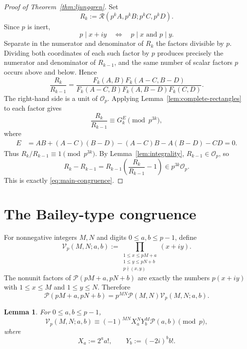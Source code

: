 \documentclass[a4paper,american,11pt]{amsart}
\numberwithin{equation}{section}
\newtheorem{lemma}[theorem]{Lemma}
\theoremstyle{definition}
\newcommand{\Op}{\mathcal O_p}
\newcommand{\Rect}{\mathcal R}
\newcommand{\Prect}{\mathcal P}
\begin{document}
\begin{proof}[Proof of Theorem~\ref{thm:ljunggren}]
Set
\[
R_k:=\Rect(p^kA,p^kB;p^kC,p^kD).
\]
Since $p$ is inert,
\[
p\mid x+iy
\quad\Longleftrightarrow\quad
p\mid x\text{ and }p\mid y.
\]
Separate in the numerator and denominator of $R_k$ the factors divisible by $p$. Dividing both coordinates of each such factor by $p$ produces precisely the numerator and denominator of $R_{k-1}$, and the same number of scalar factors $p$ occurs above and below. Hence
\begin{equation}\label{eq:R-ratio-units}
\frac{R_k}{R_{k-1}}
=
\frac{F_k(A,B)F_k(A-C,B-D)}
{F_k(A-C,B)F_k(A,B-D)F_k(C,D)}.
\end{equation}
The right-hand side is a unit of $\Op$. Applying Lemma~\ref{lem:complete-rectangles} to each factor gives
\[
\frac{R_k}{R_{k-1}}
\equiv
G_k^E
\pmod{p^{3k}},
\]
where
\begin{align*}
E
&=AB+(A-C)(B-D)-(A-C)B-A(B-D)-CD
=0.
\end{align*}
Thus $R_k/R_{k-1}\equiv1\pmod{p^{3k}}$. By Lemma~\ref{lem:integrality}, $R_{k-1}\in\Op$, so
\[
R_k-R_{k-1}
=R_{k-1}\left(\frac{R_k}{R_{k-1}}-1\right)
\in p^{3k}\Op.
\]
This is exactly \eqref{eq:main-congruence}.
\end{proof}

\section{The Bailey-type congruence}\label{sec:bailey-proof}

For nonnegative integers $M,N$ and digits $0\leq a,b\leq p-1$, define
\begin{equation}\label{eq:def-unit-product}
\mathcal V_p(M,N;a,b)
:=
\prod_{\substack{1\leq x\leq pM+a\\1\leq y\leq pN+b\\p\nmid(x,y)}}(x+iy).
\end{equation}
The nonunit factors of $\Prect(pM+a,pN+b)$ are exactly the numbers $p(x+iy)$ with $1\leq x\leq M$ and $1\leq y\leq N$. Therefore
\begin{equation}\label{eq:P-splitting}
\Prect(pM+a,pN+b)
=p^{MN}\Prect(M,N)\mathcal V_p(M,N;a,b).
\end{equation}

\begin{lemma}\label{lem:unit-product-mod-p}
For $0\leq a,b\leq p-1$,
\begin{equation}\label{eq:unit-product-mod-p}
\mathcal V_p(M,N;a,b)
\equiv
(-1)^{MN}X_a^N Y_b^M\Prect(a,b)
\pmod p,
\end{equation}
where
\[
X_a:=2^a a!,
\qquad
Y_b:=(-2i)^b b!.
\]
\end{lemma}
\end{document}
